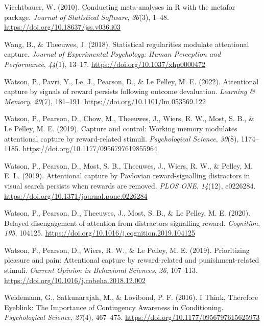 \documentclass[
  man,
  floatsintext,
  longtable,
  nolmodern,
  notxfonts,
  notimes,
  mask,
  colorlinks=true,linkcolor=blue,citecolor=blue,urlcolor=blue]{apa7}
\newlength{\cslhangindent}
\newenvironment{CSLReferences}[2] %
 {\begin{list}{}{%
  \setlength{\itemindent}{0pt}
  \setlength{\leftmargin}{0pt}
  \setlength{\parsep}{0pt}
  \ifodd #1
   \setlength{\leftmargin}{\cslhangindent}
   \setlength{\itemindent}{-1\cslhangindent}
  \fi
  \setlength{\itemsep}{#2\baselineskip}}}
 {\end{list}}
\begin{document}
\begin{CSLReferences}{1}{0}
Viechtbauer, W. (2010). Conducting meta-analyses in {R} with the
{metafor} package. \emph{Journal of Statistical Software}, \emph{36}(3),
1--48. \url{https://doi.org/10.18637/jss.v036.i03}

Wang, B., \& Theeuwes, J. (2018). Statistical regularities modulate
attentional capture. \emph{Journal of Experimental Psychology: Human
Perception and Performance}, \emph{44}(1), 13--17.
\url{https://doi.org/10.1037/xhp0000472}

Watson, P., Pavri, Y., Le, J., Pearson, D., \& Le Pelley, M. E. (2022).
Attentional capture by signals of reward persists following outcome
devaluation. \emph{Learning \& Memory}, \emph{29}(7), 181--191.
\url{https://doi.org/10.1101/lm.053569.122}

Watson, P., Pearson, D., Chow, M., Theeuwes, J., Wiers, R. W., Most, S.
B., \& Le Pelley, M. E. (2019). Capture and control: Working memory
modulates attentional capture by reward-related stimuli.
\emph{Psychological Science}, \emph{30}(8), 1174--1185.
\url{https://doi.org/10.1177/0956797619855964}

Watson, P., Pearson, D., Most, S. B., Theeuwes, J., Wiers, R. W., \&
Pelley, M. E. L. (2019). Attentional capture by Pavlovian
reward-signalling distractors in visual search persists when rewards are
removed. \emph{PLOS ONE}, \emph{14}(12), e0226284.
\url{https://doi.org/10.1371/journal.pone.0226284}

Watson, P., Pearson, D., Theeuwes, J., Most, S. B., \& Le Pelley, M. E.
(2020). Delayed disengagement of attention from distractors signalling
reward. \emph{Cognition}, \emph{195}, 104125.
\url{https://doi.org/10.1016/j.cognition.2019.104125}

Watson, P., Pearson, D., Wiers, R. W., \& Le Pelley, M. E. (2019).
Prioritizing pleasure and pain: Attentional capture by reward-related
and punishment-related stimuli. \emph{Current Opinion in Behavioral
Sciences}, \emph{26}, 107--113.
\url{https://doi.org/10.1016/j.cobeha.2018.12.002}

Weidemann, G., Satkunarajah, M., \& Lovibond, P. F. (2016). I Think,
Therefore Eyeblink: The Importance of Contingency Awareness in
Conditioning. \emph{Psychological Science}, \emph{27}(4), 467--475.
\url{https://doi.org/10.1177/0956797615625973}


\end{CSLReferences}
\end{document}
